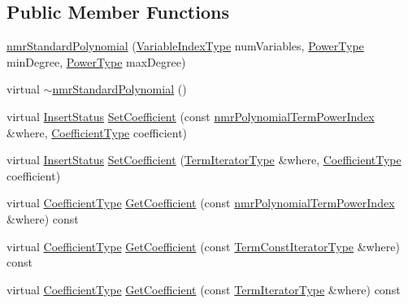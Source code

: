 \subsection*{Public Member Functions}
\begin{DoxyCompactItemize}
\item 
\hyperlink{classnmr_standard_polynomial_a3d2dfe48e85cab4978e4d1263a4e986b}{nmr\+Standard\+Polynomial} (\hyperlink{classnmr_polynomial_base_aae95477e451ddc7d3ee3f41cbdaadde2}{Variable\+Index\+Type} num\+Variables, \hyperlink{classnmr_polynomial_base_a58607c884bf2e6725a77ed4d9e14ba26}{Power\+Type} min\+Degree, \hyperlink{classnmr_polynomial_base_a58607c884bf2e6725a77ed4d9e14ba26}{Power\+Type} max\+Degree)
\item 
virtual \hyperlink{classnmr_standard_polynomial_a24d2a860f338052936536904b40e1e08}{$\sim$nmr\+Standard\+Polynomial} ()
\item 
virtual \hyperlink{classnmr_polynomial_base_ac3b6b28653104ea70419279a35580940}{Insert\+Status} \hyperlink{classnmr_standard_polynomial_a57f4a28dfc2a2a6030bbb9b82683924e}{Set\+Coefficient} (const \hyperlink{classnmr_polynomial_term_power_index}{nmr\+Polynomial\+Term\+Power\+Index} \&where, \hyperlink{classnmr_polynomial_base_a8693efdfc8585ccb49abea69f74f3eef}{Coefficient\+Type} coefficient)
\item 
virtual \hyperlink{classnmr_polynomial_base_ac3b6b28653104ea70419279a35580940}{Insert\+Status} \hyperlink{classnmr_standard_polynomial_ad74e6eb31017644b058027d3bafa263d}{Set\+Coefficient} (\hyperlink{classnmr_polynomial_container_a276e57445d038e8a16462f47b85719a3}{Term\+Iterator\+Type} \&where, \hyperlink{classnmr_polynomial_base_a8693efdfc8585ccb49abea69f74f3eef}{Coefficient\+Type} coefficient)
\item 
virtual \hyperlink{classnmr_polynomial_base_a8693efdfc8585ccb49abea69f74f3eef}{Coefficient\+Type} \hyperlink{classnmr_standard_polynomial_a8cb71742bffdae28873a6646a8fa3a9c}{Get\+Coefficient} (const \hyperlink{classnmr_polynomial_term_power_index}{nmr\+Polynomial\+Term\+Power\+Index} \&where) const 
\item 
virtual \hyperlink{classnmr_polynomial_base_a8693efdfc8585ccb49abea69f74f3eef}{Coefficient\+Type} \hyperlink{classnmr_standard_polynomial_adacf2ad64351421df2364f61bbc44dd2}{Get\+Coefficient} (const \hyperlink{classnmr_polynomial_container_aba8d31506ab6a487fdc4fe2815469442}{Term\+Const\+Iterator\+Type} \&where) const 
\item 
virtual \hyperlink{classnmr_polynomial_base_a8693efdfc8585ccb49abea69f74f3eef}{Coefficient\+Type} \hyperlink{classnmr_standard_polynomial_a005eea5f7e6c10d15b99e347563cc507}{Get\+Coefficient} (const \hyperlink{classnmr_polynomial_container_a276e57445d038e8a16462f47b85719a3}{Term\+Iterator\+Type} \&where) const 

\end{DoxyCompactItemize}
